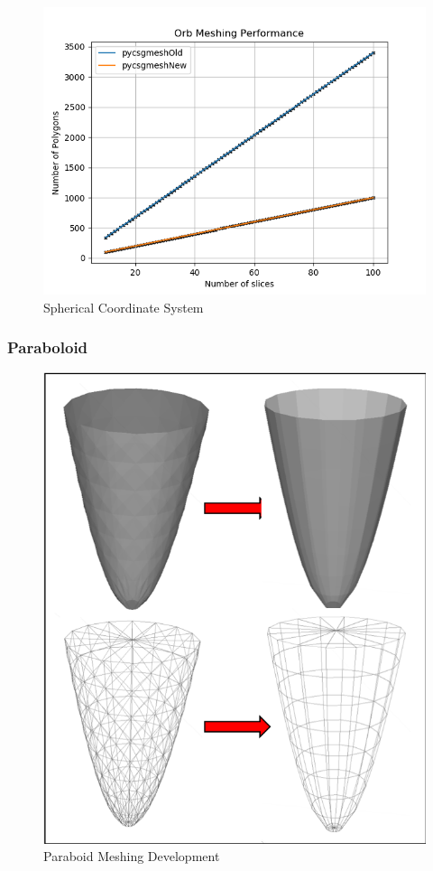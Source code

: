 \documentclass[12pt,a4paper]{article}
\begin{document}
\begin{figure}[h!]
\centering
\includegraphics[scale=0.5]{Images//Quad_fits//Orb_quad.png}
\caption[width=\columnwidth]{Spherical Coordinate System}
\label{conts}
\end{figure}


\subsubsection{Paraboloid}

\begin{figure}[h!]
\centering
\includegraphics[scale=0.5]{Images//Meshes//paraboloid.png}
\caption[width=\columnwidth]{Paraboid Meshing Development}
\label{para}
\end{figure}
\end{document}

